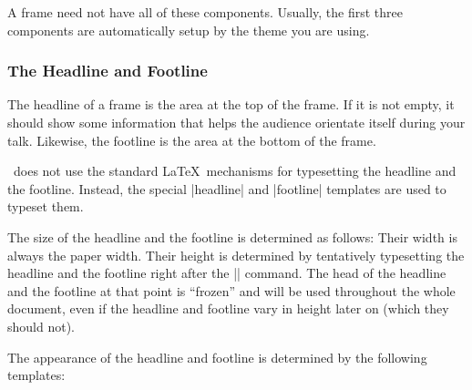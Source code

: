 A frame need not have all of these components. Usually, the first
three components are automatically setup by the theme you are using.


\subsubsection{The Headline and Footline}

The headline of a frame is the area at the top of the frame. If it is
not empty, it should show some information that helps the audience
orientate itself during your talk. Likewise, the footline is the area
at the bottom of the frame.

\beamer\ does not use the standard \LaTeX\ mechanisms for typesetting
the headline and the footline. Instead, the special |headline| and
|footline| templates are used to typeset them.

The size of the headline and the footline is determined as follows:
Their width is always the paper width. Their height is determined by
tentatively typesetting the headline and the footline right after the
|| command. The head of the headline and the footline
at that point is ``frozen'' and will be used throughout the whole
document, even if the headline and footline vary in height later on
(which they should not).

The appearance of the headline and footline is determined by the
following templates:

